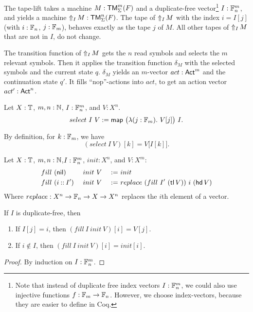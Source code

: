 The tape-lift takes a machine $M:\TM_\Sigma^m(F)$ and a duplicate-free vector\footnote{ Note that instead of duplicate free index vectors
  $I:\Fin_n^m$, we could also use injective functions $f: \Fin_m \to \Fin_n$.  However, we choose index-vectors, because they are easier to define in
  Coq.}  $I: \Fin_n^m$, and yields a machine $\LiftTapes{M}{I} : \TM_\Sigma^n(F)$.  The tape of $\LiftTapes{M}{I}$ with the index $i = I[j]$ (with
$i:\Fin_n$, $j:\Fin_m$), behaves exactly as the tape $j$ of $M$. All other tapes of $\LiftTapes{M}{I}$ that are not in $I$, do not change.


The transition function of $\LiftTapes{M}{I}$ gets the $n$ read symbols and selects the $m$ relevant symbols.  Then it applies the transition function
$\delta_M$ with the selected symbols and the current state $q$.  $\delta_M$ yields an $m$-vector $act:\Act^m$ and the continuation state $q'$.  It
fills ``nop''-actions into $act$, to get an action vector $act':\Act^n$.

\begin{definition}
  \label{def:select}
  Let $X:\Type$, $m,n:\Nat$, $I : \Fin_n^m$, and $V : X^n$.
  \[ select~I~V := \map{\bigl(\lambda (j:\Fin_m).~V[j] \bigr)}{I}. \]
\end{definition}
\begin{lemma}
  By definition, for $k:\Fin_m$, we have
  \[
    (select~I~V)[k]=V\bigl[I[k]\bigr].
  \]
\end{lemma}

\begin{definition}
  Let $X:\Type$, $m,n:\Nat$,$I:\Fin_n^m$, $init:X^n$, and $V:X^m$:
  \begin{alignat*}{3}
    & fill~(\nil      )&& ~init~V &~:=~& init \\
    & fill~(i \cons I')&& ~init~V &~:=~& replace~(fill~I'~(\tl V))~i~(\hd V)
  \end{alignat*}
  Where $replace : X^n \to \Fin_n \to X \to X^n$ replaces the $i$th element of a vector.
\end{definition}
\begin{lemma}
  If $I$ is duplicate-free, then
  \begin{enumerate}
  \item \label{lem:fill_correct_nth}
    If $I[j]=i$, then $(fill~I~init~V)[i] = V[j]$.
  \item \label{lem:fill_not_index}
    If $i \notin I$, then $(fill~I~init~V)[i] = init[i]$.
  \end{enumerate}
\end{lemma}
\begin{proof}
  By induction on $I : \Fin_n^m$.
\end{proof}


